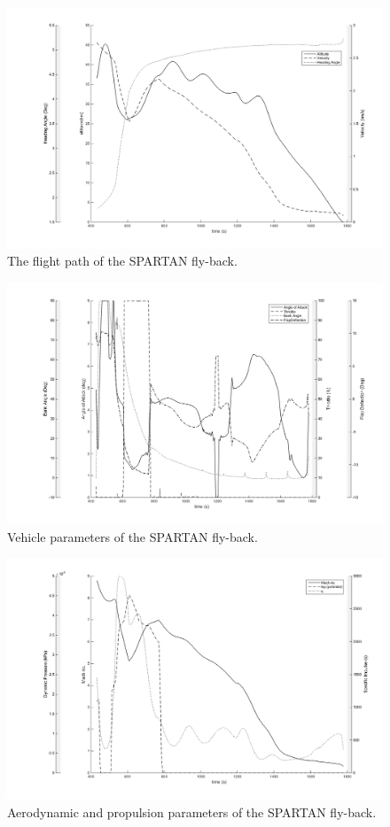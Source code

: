 \begin{figure}[H]
	\centering
	\includegraphics[width=0.7\linewidth]{figures/7_Full/FlyBack1}
	\caption{The flight path of the SPARTAN fly-back.}
	\label{fig:flyback1}
\end{figure}
\begin{figure}[H]
	\centering
	\includegraphics[width=0.7\linewidth]{figures/7_Full/FlyBack2}
	\caption{Vehicle parameters of the SPARTAN fly-back.}
	\label{fig:flyback2}
\end{figure}
\begin{figure}[H]
	\centering
	\includegraphics[width=0.7\linewidth]{figures/7_Full/FlyBack3}
	\caption{Aerodynamic and propulsion parameters of the SPARTAN fly-back.}
	\label{fig:flyback3}
\end{figure}
